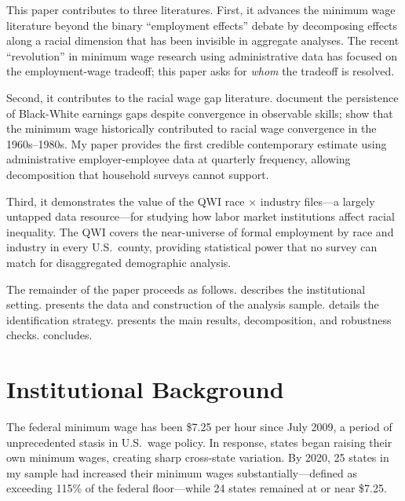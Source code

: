 \documentclass[12pt]{article}
\begin{document}
This paper contributes to three literatures. First, it advances the minimum wage literature beyond the binary ``employment effects'' debate \citep{CardKrueger1994, Neumark2007, CengizEtAl2019, DubeEtAl2010} by decomposing effects along a racial dimension that has been invisible in aggregate analyses. The recent ``revolution'' in minimum wage research using administrative data \citep{CengizEtAl2019, HarasztosiFeldmann2012, DustmannEtAl2022} has focused on the employment-wage tradeoff; this paper asks for \textit{whom} the tradeoff is resolved.

Second, it contributes to the racial wage gap literature. \citet{BayerCharles2018} document the persistence of Black-White earnings gaps despite convergence in observable skills; \citet{WilsonRodgers2016} show that the minimum wage historically contributed to racial wage convergence in the 1960s--1980s. My paper provides the first credible contemporary estimate using administrative employer-employee data at quarterly frequency, allowing decomposition that household surveys cannot support.

Third, it demonstrates the value of the QWI race $\times$ industry files---a largely untapped data resource---for studying how labor market institutions affect racial inequality. The QWI covers the near-universe of formal employment by race and industry in every U.S.\ county, providing statistical power that no survey can match for disaggregated demographic analysis.

The remainder of the paper proceeds as follows.  describes the institutional setting.  presents the data and construction of the analysis sample.  details the identification strategy.  presents the main results, decomposition, and robustness checks.  concludes.

\section{Institutional Background}
\label{sec:background}

The federal minimum wage has been \$7.25 per hour since July 2009, a period of unprecedented stasis in U.S.\ wage policy. In response, states began raising their own minimum wages, creating sharp cross-state variation. By 2020, 25 states in my sample had increased their minimum wages substantially---defined as exceeding 115\% of the federal floor---while 24 states remained at or near \$7.25.
\end{document}
